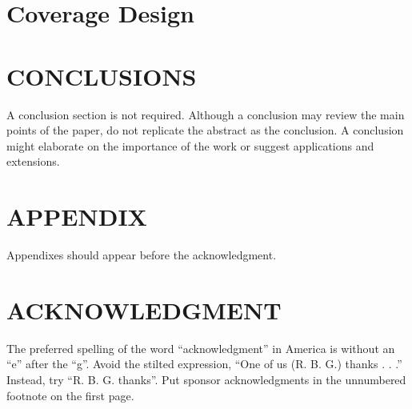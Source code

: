 \documentclass[letterpaper, 10 pt, conference]{ieeeconf}  %
\begin{document}
\section{Coverage Design}


\section{CONCLUSIONS}

A conclusion section is not required. Although a conclusion may review the main points of the paper, do not replicate the abstract as the conclusion. A conclusion might elaborate on the importance of the work or suggest applications and extensions. 

\addtolength{\textheight}{-12cm}   %







\section*{APPENDIX}

Appendixes should appear before the acknowledgment.

\section*{ACKNOWLEDGMENT}

The preferred spelling of the word ``acknowledgment'' in America is without an ``e'' after the ``g''. Avoid the stilted expression, ``One of us (R. B. G.) thanks . . .''  Instead, try ``R. B. G. thanks''. Put sponsor acknowledgments in the unnumbered footnote on the first page.
\end{document}
